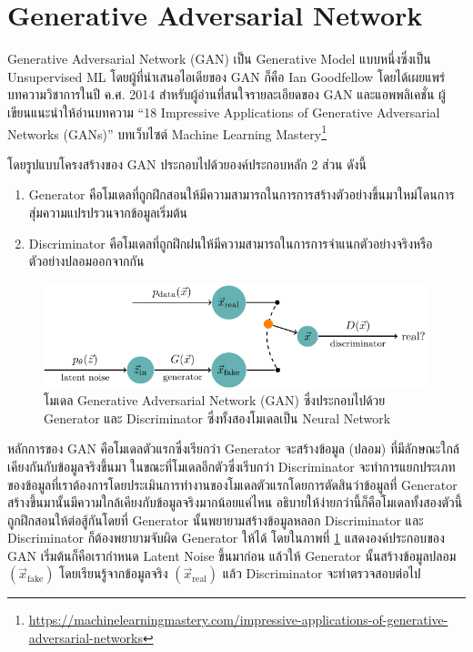 \section{Generative Adversarial Network}
\label{sec:gan}

Generative Adversarial Network (GAN) เป็น Generative Model แบบหนึ่งซึ่งเป็น Unsupervised ML โดยผู้ที่นำเสนอไอเดียของ GAN ก็คือ Ian Goodfellow โดยได้เผยแพร่บทความวิชาการในปี ค.ศ. 2014\autocite{goodfellow2014b} สำหรับผู้อ่านที่สนใจรายละเอียดของ GAN และแอพพลิเคชั่น ผู้เขียนแนะนำให้อ่านบทความ \enquote{18 Impressive Applications of Generative Adversarial Networks (GANs)} บทเว็บไซต์ Machine Learning Mastery\footnote{\url{https://machinelearningmastery.com/impressive-applications-of-generative-adversarial-networks}}

\noindent โดยรูปแบบโครงสร้างของ GAN ประกอบไปด้วยองค์ประกอบหลัก 2 ส่วน ดังนี้

\begin{enumerate}
    \item Generator คือโมเดลที่ถูกฝึกสอนให้มีความสามารถในการการสร้างตัวอย่างขึ้นมาใหม่โดนการสุ่มความแปรปรวนจากข้อมูลเริ่มต้น
    
    \item Discriminator คือโมเดลที่ถูกฝึกฝนให้มีความสามารถในการการจำแนกตัวอย่างจริงหรือตัวอย่างปลอมออกจากกัน
\end{enumerate}

\begin{figure}[H]
    \includegraphics[width=\linewidth]{fig/generative_adversarial_nets.pdf}
    \caption{โมเดล Generative Adversarial Network (GAN) ซึ่งประกอบไปด้วย Generator และ Discriminator ซึ่งทั้งสองโมเดลเป็น Neural Network}
    \label{fig:gan}
\end{figure}

หลักการของ GAN คือโมเดลตัวแรกซึ่งเรียกว่า Generator จะสร้างข้อมูล (ปลอม) ที่มีลักษณะใกล้เคียงกันกับข้อมูลจริงขึ้นมา ในขณะที่โมเดลอีกตัวซึ่งเรีบกว่า Discriminator จะทำการแยกประเภทของข้อมูลที่เราต้องการโดยประเมินการทำงานของโมเดลตัวแรกโดยการตัดสินว่าข้อมูลที่ Generator สร้างขึ้นมานั้นมีความใกล้เคียงกับข้อมูลจริงมากน้อยแค่ไหน อธิบายให้ง่ายกว่านี้ก็คือโมเดลทั้งสองตัวนี้ถูกฝึกสอนให้ต่อสู้กันโดยที่ Generator นั้นพยายามสร้างข้อมูลหลอก Discriminator และ Discriminator ก็ต้องพยายามจับผิด Generator ให้ได้ โดยในภาพที่ \ref{fig:gan} แสดงองค์ประกอบของ GAN เริ่มต้นก็คือเรากำหนด Latent Noise ขึ้นมาก่อน แล้วให้ Generator นั้นสร้างข้อมูลปลอม $(\vec{x}_{\text{fake}})$ โดยเรียนรู้จากข้อมูลจริง $(\vec{x}_{\text{real}})$ แล้ว Discriminator จะทำตรวจสอบต่อไป


